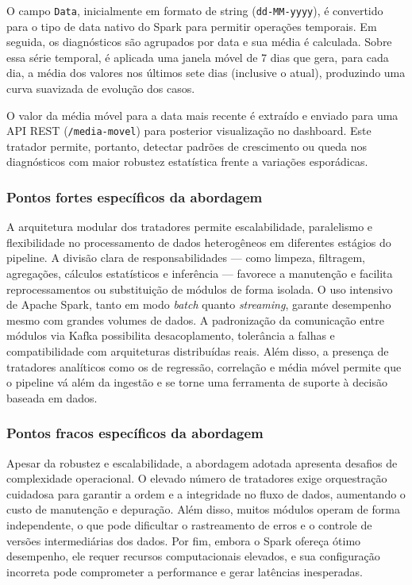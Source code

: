 \documentclass[a4paper,12pt]{article}
\begin{document}
O campo \texttt{Data}, inicialmente em formato de string (\texttt{dd-MM-yyyy}), é convertido para o tipo de data nativo do Spark para permitir operações temporais. Em seguida, os diagnósticos são agrupados por data e sua média é calculada. Sobre essa série temporal, é aplicada uma janela móvel de 7 dias que gera, para cada dia, a média dos valores nos últimos sete dias (inclusive o atual), produzindo uma curva suavizada de evolução dos casos.

O valor da média móvel para a data mais recente é extraído e enviado para uma API REST (\texttt{/media-movel}) para posterior visualização no dashboard. Este tratador permite, portanto, detectar padrões de crescimento ou queda nos diagnósticos com maior robustez estatística frente a variações esporádicas.

\subsubsection*{Pontos fortes específicos da abordagem}

A arquitetura modular dos tratadores permite escalabilidade, paralelismo e flexibilidade no processamento de dados heterogêneos em diferentes estágios do pipeline. A divisão clara de responsabilidades — como limpeza, filtragem, agregações, cálculos estatísticos e inferência — favorece a manutenção e facilita reprocessamentos ou substituição de módulos de forma isolada. O uso intensivo de Apache Spark, tanto em modo \textit{batch} quanto \textit{streaming}, garante desempenho mesmo com grandes volumes de dados. A padronização da comunicação entre módulos via Kafka possibilita desacoplamento, tolerância a falhas e compatibilidade com arquiteturas distribuídas reais. Além disso, a presença de tratadores analíticos como os de regressão, correlação e média móvel permite que o pipeline vá além da ingestão e se torne uma ferramenta de suporte à decisão baseada em dados.


\subsubsection*{Pontos fracos específicos da abordagem}

Apesar da robustez e escalabilidade, a abordagem adotada apresenta desafios de complexidade operacional. O elevado número de tratadores exige orquestração cuidadosa para garantir a ordem e a integridade no fluxo de dados, aumentando o custo de manutenção e depuração. Além disso, muitos módulos operam de forma independente, o que pode dificultar o rastreamento de erros e o controle de versões intermediárias dos dados. Por fim, embora o Spark ofereça ótimo desempenho, ele requer recursos computacionais elevados, e sua configuração incorreta pode comprometer a performance e gerar latências inesperadas.
\end{document}
